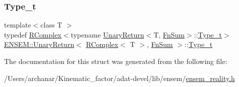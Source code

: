 \mbox{\label{structENSEM_1_1UnaryReturn_3_01RComplex_3_01T_01_4_00_01FnSum_01_4_a466a9eef64139dc94681a73722d48328}} 
\subsubsection{\texorpdfstring{Type\_t}{Type\_t}\hspace{0.1cm}{\footnotesize\ttfamily [3/3]}}
{\footnotesize\ttfamily template$<$class T $>$ \\
typedef \mbox{\hyperlink{classENSEM_1_1RComplex}{R\+Complex}}$<$typename \mbox{\hyperlink{structENSEM_1_1UnaryReturn}{Unary\+Return}}$<$T, \mbox{\hyperlink{structENSEM_1_1FnSum}{Fn\+Sum}}$>$\+::\mbox{\hyperlink{structENSEM_1_1UnaryReturn_3_01RComplex_3_01T_01_4_00_01FnSum_01_4_a466a9eef64139dc94681a73722d48328}{Type\+\_\+t}}$>$ \mbox{\hyperlink{structENSEM_1_1UnaryReturn}{E\+N\+S\+E\+M\+::\+Unary\+Return}}$<$ \mbox{\hyperlink{classENSEM_1_1RComplex}{R\+Complex}}$<$ T $>$, \mbox{\hyperlink{structENSEM_1_1FnSum}{Fn\+Sum}} $>$\+::\mbox{\hyperlink{structENSEM_1_1UnaryReturn_3_01RComplex_3_01T_01_4_00_01FnSum_01_4_a466a9eef64139dc94681a73722d48328}{Type\+\_\+t}}}



The documentation for this struct was generated from the following file\+:\begin{DoxyCompactItemize}
\item 
/\+Users/archanar/\+Kinematic\+\_\+factor/adat-\/devel/lib/ensem/\mbox{\hyperlink{adat-devel_2lib_2ensem_2ensem__reality_8h}{ensem\+\_\+reality.\+h}}\end{DoxyCompactItemize}
